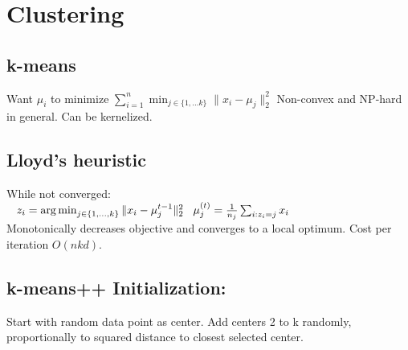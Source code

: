 \section*{Clustering}
\subsection*{k-means}
Want $\mu_i$ to minimize $\sum_{i=1}^n \min_{j\in\{1,...k\}}\|x_i-\mu_j\|_2^2$
Non-convex and NP-hard in general. Can be kernelized.

\subsection*{Lloyd's heuristic}
While not converged:\\
$\hspace*{3mm}z_i = \operatorname*{arg\,min}_{j\in\{1,...,k\}}\|x_i - \mu_j^{t-1}\|_2^2\\
\hspace*{3mm}\mu_j^{(t)} = \frac{1}{n_j}\sum_{i:z_i=j}x_i$\\
Monotonically decreases objective and converges to a local 
optimum. Cost per iteration $O(nkd)$.


\subsection*{k-means++ Initialization:}
Start with random data point as center.
Add centers 2 to k randomly, proportionally to squared distance to closest selected center.
\\